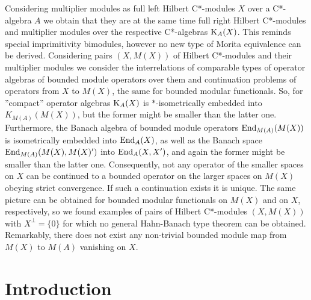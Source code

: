 \documentclass{amsart}
\theoremstyle{definition}
\begin{document}
Considering multiplier modules as full left Hilbert C*-modules $X$ over a C*-algebra $A$ we obtain that they are at the same time full right Hilbert C*-modules and multiplier modules over the respective C*-algebras ${\rm K}_A(X)$. This reminds special imprimitivity bimodules, however no new type of Morita equivalence can be derived. Considering pairs $(X,M(X))$ of Hilbert C*-modules and their multiplier modules we consider the interrelations of comparable types of operator algebras of bounded module operators over them and continuation problems of operators from $X$ to $M(X)$, the same for bounded modular functionals. So, for ''compact'' operator algebras ${\rm K}_A(X)$ is $*$-isometrically embedded into $K_{M(A)}(M(X))$, but the former might be smaller than the latter one. Furthermore, the Banach algebra of bounded module operators ${\rm End}_{M(A)}(M(X))$ is isometrically embedded into ${\rm End}_A(X)$, as well as the Banach space ${\rm End}_{M(A)}(M(X),M(X)')$ into ${\rm End}_A(X,X')$, and again the former might be smaller than the latter one. Consequently, not any operator of the smaller spaces on $X$ can be continued to a bounded operator on the larger spaces on $M(X)$ obeying strict convergence. If such a continuation exists it is unique. The same picture can be obtained for bounded modular functionals on $M(X)$ and on $X$, respectively, so we found examples of pairs of Hilbert C*-modules $(X,M(X))$ with $X^\bot = \{ 0 \}$ for which no general Hahn-Banach type theorem can be obtained. Remarkably, there does not exist any non-trivial bounded module map from $M(X)$ to $M(A)$ vanishing on $X$. 

\section{Introduction}
\end{document}
